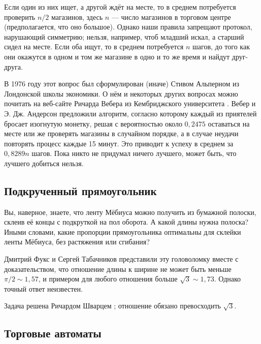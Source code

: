 \medskip

Если один из них ищет, а другой ждёт на месте, то в среднем потребуется проверить $n/2$ магазинов, здесь $n$ --- число магазинов в торговом центре (предполагается, что оно большое).
Однако наши правила запрещают протокол, нарушающий симметрию;
нельзя, например, чтоб младший искал, а старший сидел на месте.
Если оба ищут, то в среднем потребуется $n$ шагов, до того как они окажутся в одном и том же магазине в одно и то же время и найдут друг-друга.

В 1976 году этот вопрос был сформулирован (иначе) Стивом Альперном из Лондонской школы экономики.
О нём и некоторых других вопросах можно почитать на веб-сайте Ричарда Вебера из Кембриджского университета \cite{weber}.
Вебер и Э. Дж. Андерсон предложили алгоритм, согласно которому каждый из приятелей бросает изогнутую монетку, решая с вероятностью около $0{,}2475$ оставаться на месте или же проверять магазины в случайном порядке, а в случае неудачи повторять процесс каждые 15 минут.
Это приводит к успеху в среднем за $0{,}8289n$ шагов.
Пока никто не придумал ничего лучшего, может быть, что лучшего добиться нельзя.



\subsection*{Подкрученный прямоугольник}

Вы, наверное, знаете, что ленту Мёбиуса можно получить из бумажной полоски, склеив её концы с подкруткой на пол оборота.
А какой длины нужна полоска?
Иными словами, какие пропорции прямоугольника оптимальны для склейки ленты Мёбиуса, без растяжения или сгибания?

Дмитрий Фукс и Сергей Табачников представили эту головоломку \cite[Лекция 14]{19} вместе с доказательством, что отношение длины к ширине не может быть меньше $\pi/2 \sim 1{,}57$, и примером для любого отношения больше $\sqrt{3} \sim 1{,}73$.
Однако точный ответ неизвестен.

\begin{addedbytheeditors}
Задача решена Ричардом Шварцем \cite{schwartz}; отношение обязано превосходить $\sqrt{3}$.
\pr
\end{addedbytheeditors}


\subsection*{Торговые автоматы}


